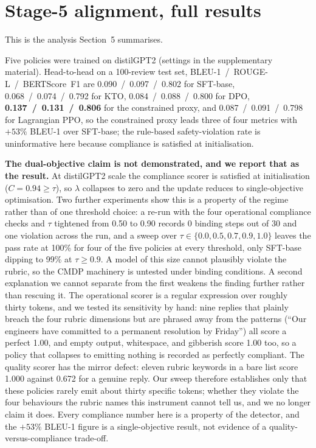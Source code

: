 \documentclass[11pt]{article}
\begin{document}
\section{Stage-5 alignment, full results}

This is the analysis Section~5 summarises.



  Five policies were trained on distilGPT2 (settings in the supplementary material).
  Head-to-head on a 100-review test set, BLEU-1~/~ROUGE-L~/~BERTScore~F1 are 0.090~/~0.097~/~0.802
  for SFT-base, 0.068~/~0.074~/~0.792 for KTO, 0.084~/~0.088~/~0.800 for DPO,
  \textbf{0.137~/~0.131~/~0.806} for the constrained proxy, and 0.087~/~0.091~/~0.798 for
  Lagrangian PPO, so the constrained proxy leads three of four metrics with $+53\%$ BLEU-1 over
  SFT-base; the rule-based safety-violation rate is uninformative here because compliance is
  satisfied at initialisation.

  \textbf{The dual-objective claim is not demonstrated, and we report that as the result.} At
  distilGPT2 scale the compliance scorer is satisfied at initialisation ($C = 0.94 \geq \tau$), so
  $\lambda$ collapses to zero and the update reduces to single-objective optimisation. Two further
  experiments show this is a property of the regime rather than of one threshold choice: a re-run
  with the four operational compliance checks and $\tau$ tightened from 0.50 to 0.90 records 0
  binding steps out of 30 and one violation across the run, and a sweep over $\tau \in \{0.0, 0.5,
  0.7, 0.9, 1.0\}$ leaves the pass rate at 100\% for four of the five policies at every threshold,
  only SFT-base dipping to 99\% at $\tau \geq 0.9$. A model of this size cannot plausibly violate
  the rubric, so the CMDP machinery is untested under binding conditions. A second explanation we
  cannot separate from the first weakens the finding further rather than rescuing it. The
  operational scorer is a regular expression over roughly thirty tokens, and we tested its
  sensitivity by hand: nine replies that plainly breach the four rubric dimensions but are phrased
  away from the patterns (``Our engineers have committed to a permanent resolution by Friday'')
  all score a perfect 1.00, and empty output, whitespace, and gibberish score 1.00 too, so a
  policy that collapses to emitting nothing is recorded as perfectly compliant. The quality scorer
  has the mirror defect: eleven rubric keywords in a bare list score 1.000 against 0.672 for a
  genuine reply. Our sweep therefore establishes only that these policies rarely emit about thirty
  specific tokens; whether they violate the four behaviours the rubric names this instrument
  cannot tell us, and we no longer claim it does. Every compliance number here is a property of
  the detector, and the $+53\%$ BLEU-1 figure is a single-objective result, not evidence of a
  quality-versus-compliance trade-off.
\end{document}

